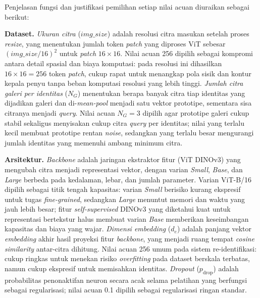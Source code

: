 Penjelasan fungsi dan justifikasi pemilihan setiap nilai acuan diuraikan sebagai berikut:

\textbf{Dataset.} \textit{Ukuran citra} ($\mathit{img\_size}$) adalah resolusi citra masukan setelah proses \textit{resize}, yang menentukan jumlah token \textit{patch} yang diproses ViT sebesar $(\mathit{img\_size}/16)^2$ untuk \textit{patch} $16\times16$. Nilai acuan 256 dipilih sebagai kompromi antara detail spasial dan biaya komputasi: pada resolusi ini dihasilkan $16\times16=256$ token \textit{patch}, cukup rapat untuk menangkap pola sisik dan kontur kepala penyu tanpa beban komputasi resolusi yang lebih tinggi. \textit{Jumlah citra galeri per identitas} ($N_G$) menentukan berapa banyak citra tiap identitas yang dijadikan galeri dan di-\textit{mean-pool} menjadi satu vektor prototipe, sementara sisa citranya menjadi \textit{query}. Nilai acuan $N_G=3$ dipilih agar prototipe galeri cukup stabil sekaligus menyisakan cukup citra \textit{query} per identitas; nilai yang terlalu kecil membuat prototipe rentan \textit{noise}, sedangkan yang terlalu besar mengurangi jumlah identitas yang memenuhi ambang minimum citra.

\textbf{Arsitektur.} \textit{Backbone} adalah jaringan ekstraktor fitur (ViT DINOv3) yang mengubah citra menjadi representasi vektor, dengan varian \textit{Small}, \textit{Base}, dan \textit{Large} berbeda pada kedalaman, lebar, dan jumlah parameter. Varian ViT-B/16 dipilih sebagai titik tengah kapasitas: varian \textit{Small} berisiko kurang ekspresif untuk tugas \textit{fine-grained}, sedangkan \textit{Large} menuntut memori dan waktu yang jauh lebih besar; fitur \textit{self-supervised} DINOv3 yang diketahui kuat untuk representasi bertekstur halus membuat varian \textit{Base} memberikan keseimbangan kapasitas dan biaya yang wajar. \textit{Dimensi embedding} ($d_e$) adalah panjang vektor \textit{embedding} akhir hasil proyeksi fitur \textit{backbone}, yang menjadi ruang tempat \textit{cosine similarity} antar-citra dihitung. Nilai acuan 256 umum pada sistem re-identifikasi: cukup ringkas untuk menekan risiko \textit{overfitting} pada dataset berskala terbatas, namun cukup ekspresif untuk memisahkan identitas. \textit{Dropout} ($p_{\text{drop}}$) adalah probabilitas penonaktifan neuron secara acak selama pelatihan yang berfungsi sebagai regularisasi; nilai acuan 0.1 dipilih sebagai regularisasi ringan standar.

